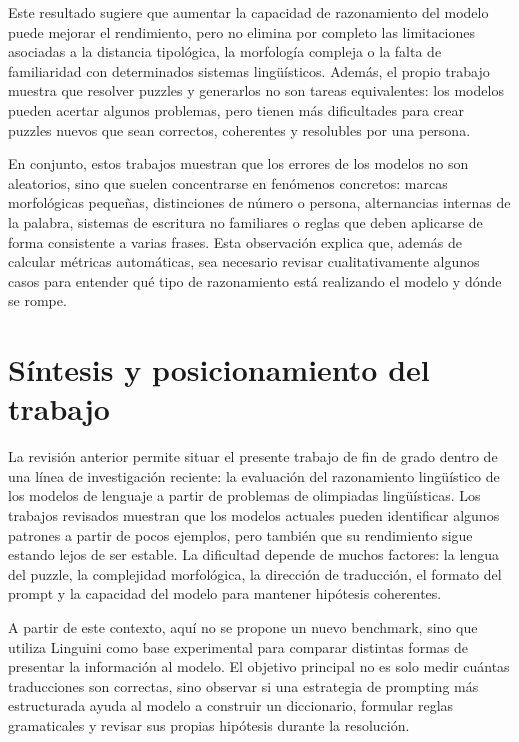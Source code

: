 Este resultado sugiere que aumentar la capacidad de razonamiento del modelo puede mejorar el rendimiento, pero no elimina por completo las limitaciones asociadas a la distancia tipológica, la morfología compleja o la falta de familiaridad con determinados sistemas lingüísticos. Además, el propio trabajo muestra que resolver puzzles y generarlos no son tareas equivalentes: los modelos pueden acertar algunos problemas, pero tienen más dificultades para crear puzzles nuevos que sean correctos, coherentes y resolubles por una persona.

En conjunto, estos trabajos muestran que los errores de los modelos no son aleatorios, sino que suelen concentrarse en fenómenos concretos: marcas morfológicas pequeñas, distinciones de número o persona, alternancias internas de la palabra, sistemas de escritura no familiares o reglas que deben aplicarse de forma consistente a varias frases. Esta observación explica que, además de calcular métricas automáticas, sea necesario revisar cualitativamente algunos casos para entender qué tipo de razonamiento está realizando el modelo y dónde se rompe.

\section{Síntesis y posicionamiento del trabajo}
\label{sec:sintesis}

La revisión anterior permite situar el presente trabajo de fin de grado dentro de una línea de investigación reciente: la evaluación del razonamiento lingüístico de los modelos de lenguaje a partir de problemas de olimpiadas lingüísticas. Los trabajos revisados muestran que los modelos actuales pueden identificar algunos patrones a partir de pocos ejemplos, pero también que su rendimiento sigue estando lejos de ser estable. La dificultad depende de muchos factores: la lengua del puzzle, la complejidad morfológica, la dirección de traducción, el formato del prompt y la capacidad del modelo para mantener hipótesis coherentes.

A partir de este contexto, aquí no se propone un nuevo benchmark, sino que utiliza Linguini como base experimental para comparar distintas formas de presentar la información al modelo. El objetivo principal no es solo medir cuántas traducciones son correctas, sino observar si una estrategia de prompting más estructurada ayuda al modelo a construir un diccionario, formular reglas gramaticales y revisar sus propias hipótesis durante la resolución.

